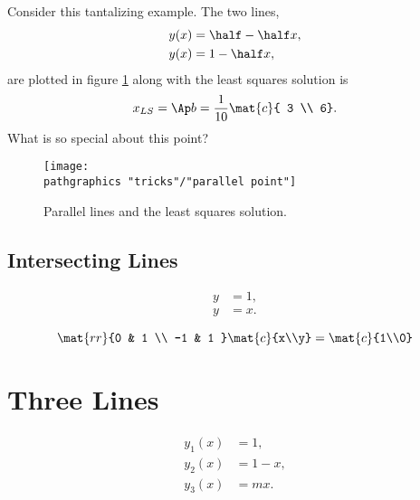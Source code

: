 Consider this tantalizing example. The two lines,
  \begin{equation*}   %
    \begin{split}
      y(x) &= \half - \half x, \\
      y(x) &= 1 - \half x,
    \end{split}
  \end{equation*}
are plotted in figure \ref{fig:tantalizing} along with the least squares solution is 
  \begin{equation*}   %
      x_{LS} = \Ap b = \frac{1}{10}\mat{c}{ 3 \\ 6}.
  \end{equation*}
What is so special about this point?
\begin{figure}[htbp] %
   \centering
     \texttt{[image: \\pathgraphics "tricks"/"parallel point"]} 
   \caption{Parallel lines and the least squares solution.}
   \label{fig:tantalizing}
\end{figure}

\subsection{Intersecting Lines}
  \begin{equation*}   %
   \begin{split}
      y &= 1, \\
      y &= x .
   \end{split}
  \end{equation*}

  \begin{equation*}   %
      \mat{rr}{0 & 1 \\ -1 & 1 }\mat{c}{x\\y} = \mat{c}{1\\0}
  \end{equation*}


\section{Three Lines}  %
  \begin{equation*}   %
     \begin{split}
       y_{1}(x) &= 1, \\
       y_{2}(x) &= 1 - x, \\
       y_{3}(x) &= m x.
     \end{split}
  \end{equation*}

